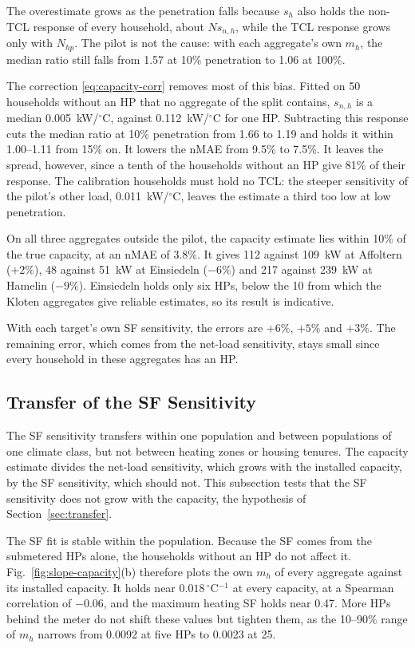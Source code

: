 The overestimate grows as the penetration falls because $s_h$ also holds the non-TCL response of every household, about $N s_{n,h}$, while the TCL response grows only with $N_{hp}$. The pilot is not the cause: with each aggregate's own $m_h$, the median ratio still falls from 1.57 at 10\% penetration to 1.06 at 100\%.

The correction \eqref{eq:capacity-corr} removes most of this bias. Fitted on 50 households without an HP that no aggregate of the split contains, $s_{n,h}$ is a median 0.005~kW/$^\circ$C, against 0.112~kW/$^\circ$C for one HP. Subtracting this response cuts the median ratio at 10\% penetration from 1.66 to 1.19 and holds it within 1.00--1.11 from 15\% on. It lowers the nMAE from 9.5\% to 7.5\%. It leaves the spread, however, since a tenth of the households without an HP give 81\% of their response. The calibration households must hold no TCL: the steeper sensitivity of the pilot's other load, 0.011~kW/$^\circ$C, leaves the estimate a third too low at low penetration.

On all three aggregates outside the pilot, the capacity estimate lies within 10\% of the true capacity, at an nMAE of 3.8\%. It gives 112 against 109~kW at Affoltern ($+2\%$), 48 against 51~kW at Einsiedeln ($-6\%$) and 217 against 239~kW at Hamelin ($-9\%$). Einsiedeln holds only six HPs, below the 10 from which the Kloten aggregates give reliable estimates, so its result is indicative.

With each target's own SF sensitivity, the errors are $+6\%$, $+5\%$ and $+3\%$. The remaining error, which comes from the net-load sensitivity, stays small since every household in these aggregates has an HP.

\subsection{Transfer of the SF Sensitivity}
\label{sec:res-sf}

The SF sensitivity transfers within one population and between populations of one climate class, but not between heating zones or housing tenures. The capacity estimate divides the net-load sensitivity, which grows with the installed capacity, by the SF sensitivity, which should not. This subsection tests that the SF sensitivity does not grow with the capacity, the hypothesis of Section~\ref{sec:transfer}.

The SF fit is stable within the population. Because the SF comes from the submetered HPs alone, the households without an HP do not affect it. Fig.~\ref{fig:slope-capacity}(b) therefore plots the own $m_h$ of every aggregate against its installed capacity. It holds near $0.018\,^\circ$C$^{-1}$ at every capacity, at a Spearman correlation of $-0.06$, and the maximum heating SF holds near 0.47.
More HPs behind the meter do not shift these values but tighten them, as the 10--90\% range of $m_h$ narrows from 0.0092 at five HPs to 0.0023 at 25.

